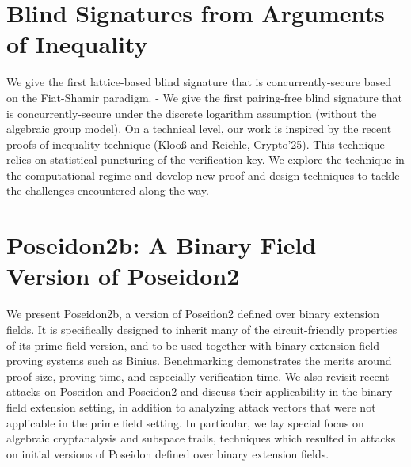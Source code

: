 \documentclass[11pt,oneside]{book}
\theoremstyle{definition}
\theoremstyle{remark}
\theoremstyle{plain}
\begin{document}
\section{\cite{cryptoeprint:2025/1886} Blind Signatures from Arguments of Inequality}
We give the first lattice-based blind signature that is concurrently-secure based on the Fiat-Shamir paradigm. - We give the first pairing-free blind signature that is concurrently-secure under the discrete logarithm assumption (without the algebraic group model). On a technical level, our work is inspired by the recent proofs of inequality technique (Klooß and Reichle, Crypto'25). This technique relies on statistical puncturing of the verification key. We explore the technique in the computational regime and develop new proof and design techniques to tackle the challenges encountered along the way.

\section{\cite{cryptoeprint:2025/1893} Poseidon2b: A Binary Field Version of Poseidon2}
We present Poseidon2b, a version of Poseidon2 defined over binary extension fields. It is specifically designed to inherit many of the circuit-friendly properties of its prime field version, and to be used together with binary extension field proving systems such as Binius. Benchmarking demonstrates the merits around proof size, proving time, and especially verification time.  
We also revisit recent attacks on Poseidon and Poseidon2 and discuss their applicability in the binary field extension setting, in addition to analyzing attack vectors that were not applicable in the prime field setting. In particular, we lay special focus on algebraic cryptanalysis and subspace trails, techniques which resulted in attacks on initial versions of Poseidon defined over binary extension fields.
\end{document}
